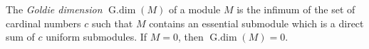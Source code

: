 The \emph{Goldie dimension} $\operatorname{G.dim}(M)$ of a module $M$ is the infimum of the set of cardinal numbers $c$ such that $M$ contains an essential submodule which is a direct sum of $c$ uniform submodules. If $M = 0$, then $\operatorname{G.dim}(M) = 0$.
